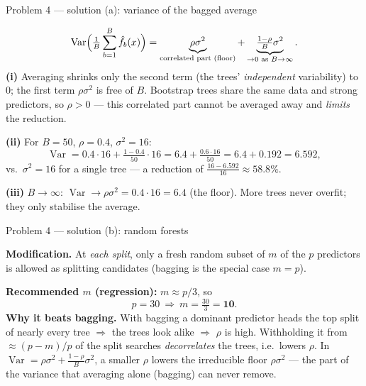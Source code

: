 \documentclass[aspectratio=169,11pt]{beamer}
\begin{document}
\begin{frame}{Problem 4 --- solution (a): variance of the bagged average}
  \begin{solutionbox}
    \[
      \operatorname{Var}\Bigl(\tfrac1B\sum_{b=1}^B\hat f_b(x)\Bigr)
      =\underbrace{\rho\sigma^2}_{\text{correlated part (floor)}}
      +\underbrace{\tfrac{1-\rho}{B}\sigma^2}_{\to0\text{ as }B\to\infty}.
    \]
    \textbf{(i)} Averaging shrinks only the second term (the trees' \emph{independent}
    variability) to $0$; the first term $\rho\sigma^2$ is free of $B$. Bootstrap trees share the
    same data and strong predictors, so $\rho>0$ --- this correlated part cannot be averaged away
    and \emph{limits} the reduction.
    \smallskip

    \textbf{(ii)} For $B=50$, $\rho=0.4$, $\sigma^2=16$:
    \[
      \operatorname{Var}=0.4\cdot16+\tfrac{1-0.4}{50}\cdot16=6.4+\tfrac{0.6\cdot16}{50}
      =6.4+0.192=\mathbf{6.592},
    \]
    vs.\ $\sigma^2=16$ for a single tree --- a reduction of $\tfrac{16-6.592}{16}\approx58.8\%$.
    \smallskip

    \textbf{(iii)} $B\to\infty$: $\operatorname{Var}\to\rho\sigma^2=0.4\cdot16=\mathbf{6.4}$ (the
    floor). More trees never overfit; they only stabilise the average.
  \end{solutionbox}
\end{frame}

\begin{frame}{Problem 4 --- solution (b): random forests}
  \begin{solutionbox}
    \textbf{Modification.} At \emph{each split}, only a fresh random subset of $m$ of the $p$
    predictors is allowed as splitting candidates (bagging is the special case $m=p$).
    \medskip

    \textbf{Recommended $m$ (regression):} $m\approx p/3$, so
    \[
      p=30\ \Longrightarrow\ m=\tfrac{30}{3}=\mathbf{10}.
    \]
    \textbf{Why it beats bagging.} With bagging a dominant predictor heads the top split of nearly
    every tree $\Rightarrow$ the trees look alike $\Rightarrow$ $\rho$ is high. Withholding it from
    $\approx(p-m)/p$ of the split searches \emph{decorrelates} the trees, i.e.\ lowers $\rho$. In
    $\operatorname{Var}=\rho\sigma^2+\tfrac{1-\rho}{B}\sigma^2$, a smaller $\rho$ lowers the
    irreducible floor $\rho\sigma^2$ --- the part of the variance that averaging alone (bagging)
    can never remove.
  \end{solutionbox}
\end{frame}
\end{document}
